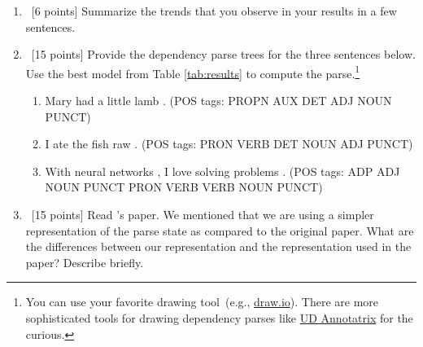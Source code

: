 \begin{enumerate}
    \item~[6 points] Summarize the trends that you observe in your results in a few sentences.
    \item~[15 points] Provide the dependency parse trees for the three sentences below. Use the best model from Table \ref{tab:results} to compute the parse.\footnote{You can use your favorite drawing tool~(e.g., \href{https://app.diagrams.net/}{draw.io}). There are more sophisticated tools for drawing dependency parses like \href{https://github.com/jonorthwash/ud-annotatrix}{UD Annotatrix} for the curious.}
        \begin{enumerate}
            \item Mary had a little lamb . (POS tags: PROPN AUX DET ADJ NOUN PUNCT)
            \item I ate the fish raw . (POS tags: PRON VERB DET NOUN ADJ PUNCT)
            \item With neural networks , I love solving problems . (POS tags: ADP ADJ NOUN PUNCT PRON VERB VERB NOUN PUNCT)
        \end{enumerate}
    \item~[15 points] Read \citet{chen2014fast}'s paper. We mentioned that we are using a simpler representation of the parse state as compared to the original paper. What are the differences between our representation and the representation used in the paper? Describe briefly. 
\end{enumerate}